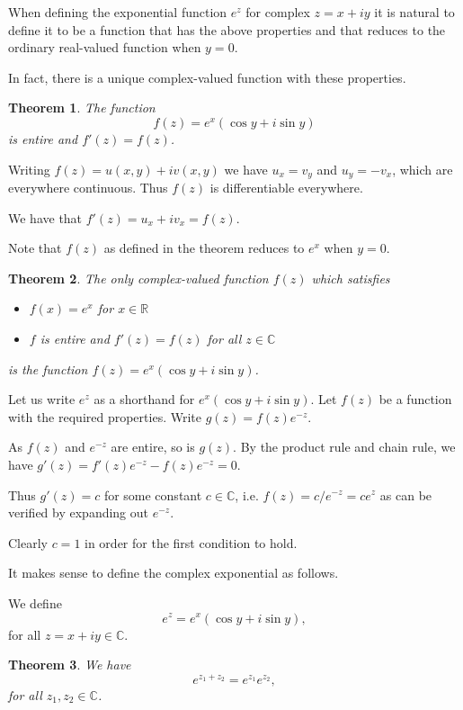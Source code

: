 \documentclass[a4paper,10pt]{article}
\newcommand{\C}{\mathbb{C}}
\newcommand{\R}{\mathbb{R}}
\newtheorem{theorem}{Theorem}[section]
\newenvironment{definition}[1][Definition]{\begin{trivlist}
\item[\hskip \labelsep {\bfseries #1}]}{\end{trivlist}}
\begin{document}
When defining the exponential function $e^z$ for complex $z = x + iy$ it is natural to define it to be a function that has the above properties and that reduces to the ordinary real-valued function when $y = 0$.

In fact, there is a unique complex-valued function with these properties.

\begin{theorem}
The function
$$f(z) = e^x(\cos y + i\sin y)$$
is entire and $f'(z) = f(z)$.
\end{theorem}

Writing $f(z) = u(x, y) + iv(x, y)$ we have $u_x = v_y$ and $u_y = -v_x$, which are everywhere continuous. Thus $f(z)$ is differentiable everywhere.

We have that $f'(z) = u_x + iv_x = f(z)$.

Note that $f(z)$ as defined in the theorem reduces to $e^x$ when $y = 0$.

\begin{theorem}
The only complex-valued function $f(z)$ which satisfies
\begin{itemize}
\item $f(x) = e^x$ for $x \in \R$
\item $f$ is entire and $f'(z) = f(z)$ for all $z \in \C$
\end{itemize}
is the function $f(z) = e^x(\cos y + i\sin y)$.
\end{theorem}

Let us write $e^z$ as a shorthand for $e^x(\cos y + i\sin y)$. Let $f(z)$ be a function with the required properties. Write $g(z) = f(z)e^{-z}$.

As $f(z)$ and $e^{-z}$ are entire, so is $g(z)$. By the product rule and chain rule, we have
$g'(z) = f'(z)e^{-z} - f(z)e^{-z} = 0$.

Thus $g'(z) = c$ for some constant $c \in \C$, i.e. $f(z) = c/e^{-z} = ce^z$ as can be verified by expanding out $e^{-z}$.

Clearly $c = 1$ in order for the first condition to hold.

It makes sense to define the complex exponential as follows.

\begin{definition}
We define
$$e^z = e^x(\cos y + i\sin y),$$
for all $z = x + iy \in \C$.
\end{definition}

\begin{theorem}
We have
$$e^{z_1 + z_2} = e^{z_1}e^{z_2},$$
for all $z_1, z_2 \in \C$.
\end{theorem}
\end{document}
